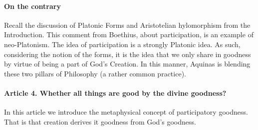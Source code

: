 \documentclass{ucetd}
\begin{document}
\paragraph{On the contrary}
Recall the discussion of Platonic Forms and Aristotelian hylomorphism from the Introduction. This comment from Boethius, about participation, is an example of neo-Platonism. The idea of participation is a strongly Platonic idea. As such, considering the notion of the forms, it is the idea that we only share in goodness by virtue of being a part of God's Creation. In this manner, Aquinas is blending these two pillars of Philosophy (a rather common practice).

\paragraph{Article 4. Whether all things are good by the divine goodness?}
In this article we introduce the metaphysical concept of participatory goodness. That is that creation derives it goodness from God's goodness.
\end{document}
